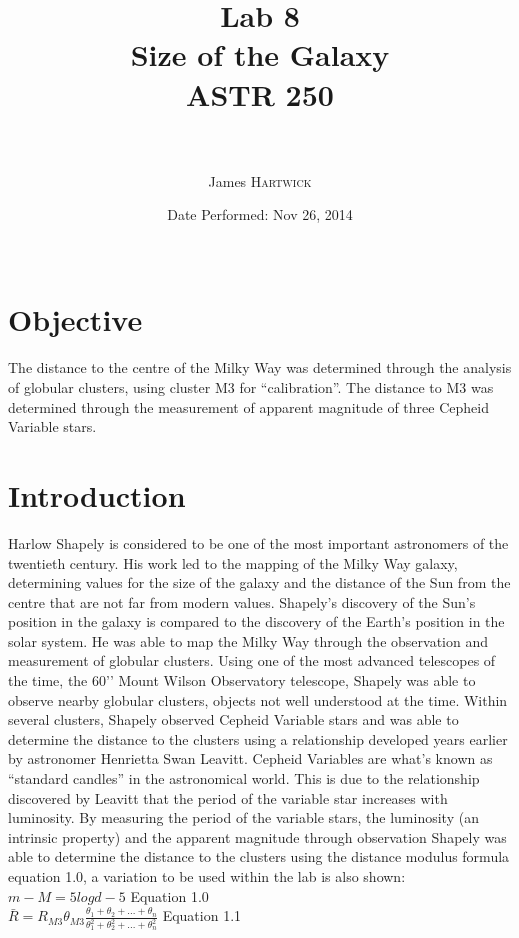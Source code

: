 \documentclass{article}
\title{Lab 8 \\ Size of the Galaxy \\ ASTR 250\\ \ \\ } %
\author{James \textsc{Hartwick}} %
\date{Date Performed: Nov 26, 2014\\ \ } %
\begin{document}
\maketitle %


\section{Objective}
The distance to the centre of the Milky Way was determined through the analysis of globular clusters, using cluster M3 for “calibration”. The distance to M3 was determined through the measurement of apparent magnitude of three Cepheid Variable stars.\\
\section{Introduction}
Harlow Shapely is considered to be one of the most important astronomers of the twentieth century. His work led to the mapping of the Milky Way galaxy, determining values for the size of the galaxy and the distance of the Sun from the centre that are not far from modern values. Shapely’s discovery of the Sun’s position in the galaxy is compared to the discovery of the Earth’s position in the solar system. He was able to map the Milky Way through the observation and measurement of globular clusters. Using one of the most advanced telescopes of the time, the 60’’ Mount Wilson Observatory telescope, Shapely was able to observe nearby globular clusters, objects not well understood at the time. Within several clusters, Shapely observed Cepheid Variable stars and was able to determine the distance to the clusters using a relationship developed years earlier by astronomer Henrietta Swan Leavitt. Cepheid Variables are what’s known as “standard candles” in the astronomical world. This is due to the relationship discovered by Leavitt that the period of the variable star increases with luminosity. By measuring the period of the variable stars, the luminosity (an intrinsic property) and the apparent magnitude through observation Shapely was able to determine the distance to the clusters using the distance modulus formula equation 1.0, a variation to be used within the lab is also shown:\\

$m-M=5logd-5$ Equation 1.0\\

$\bar R=R_{M3}\theta_{M3}\frac{\theta_1+\theta_2+...+\theta_n}{\theta_1^2+\theta_2^2+...+\theta_n^2}$ Equation 1.1\\
\end{document}
